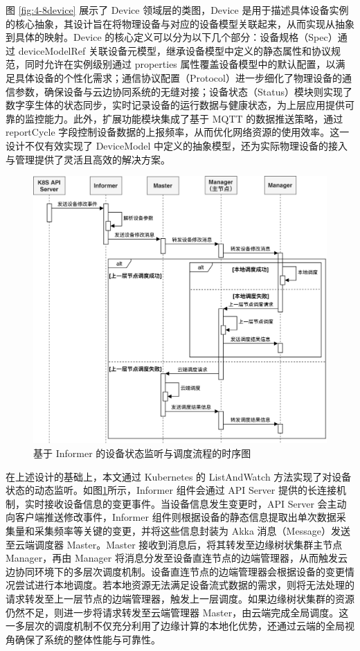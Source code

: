 图 \ref{fig:4-8device} 展示了 Device 领域层的类图，Device 是用于描述具体设备实例的核心抽象，其设计旨在将物理设备与对应的设备模型关联起来，从而实现从抽象到具体的映射。Device 的核心定义可以分为以下几个部分：设备规格（Spec）通过 deviceModelRef 关联设备元模型，继承设备模型中定义的静态属性和协议规范，同时允许在实例级别通过 properties 属性覆盖设备模型中的默认配置，以满足具体设备的个性化需求；通信协议配置（Protocol）进一步细化了物理设备的通信参数，确保设备与云边协同系统的无缝对接；设备状态（Status）模块则实现了数字孪生体的状态同步，实时记录设备的运行数据与健康状态，为上层应用提供可靠的监控能力。此外，扩展功能模块集成了基于 MQTT 的数据推送策略，通过 reportCycle 字段控制设备数据的上报频率，从而优化网络资源的使用效率。这一设计不仅有效实现了 DeviceModel 中定义的抽象模型，还为实际物理设备的接入与管理提供了灵活且高效的解决方案。

\begin{figure}[ht]
  \centering
  \includegraphics[width=\linewidth]{pics/4-10informer时序.png}
  \caption{基于 Informer 的设备状态监听与调度流程的时序图}
  \label{fig:4-10informer}
\end{figure}

在上述设计的基础上，本文通过 Kubernetes 的 ListAndWatch 方法实现了对设备状态的动态监听。如图\ref{fig:4-10informer}所示，Informer 组件会通过 API Server 提供的长连接机制，实时接收设备信息的变更事件。当设备信息发生变更时，API Server 会主动向客户端推送修改事件，Informer 组件则根据设备的静态信息提取出单次数据采集量和采集频率等关键的变更，并将这些信息封装为 Akka 消息（Message）发送至云端调度器 Master。Master 接收到消息后，将其转发至边缘树状集群主节点 Manager，再由 Manager 将消息分发至设备直连节点的边端管理器，从而触发云边协同环境下的多层次调度机制。设备直连节点的边端管理器会根据设备的变更情况尝试进行本地调度。若本地资源无法满足设备流式数据的需求，则将无法处理的请求转发至上一层节点的边端管理器，触发上一层调度。如果边缘树状集群的资源仍然不足，则进一步将请求转发至云端管理器 Master，由云端完成全局调度。这一多层次的调度机制不仅充分利用了边缘计算的本地化优势，还通过云端的全局视角确保了系统的整体性能与可靠性。

